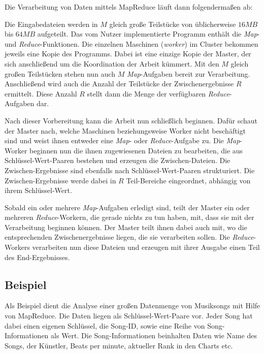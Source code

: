 Die Verarbeitung von Daten mittels MapReduce läuft dann folgendermaßen ab:

Die Eingabedateien werden in $M$ gleich große Teilstücke von üblicherweise $16 MB$ bis $64 MB$
aufgeteilt. Das vom Nutzer implementierte Programm enthält die \textit{Map}- und 
\textit{Reduce}-Funktionen. Die einzelnen Maschinen (\textit{worker}) im Cluster bekommen jeweils
eine Kopie des Programms. Dabei ist eine einzige Kopie der Master, der sich anschließend
um die Koordination der Arbeit kümmert. Mit den $M$ gleich großen Teilstücken stehen nun
auch $M $ \textit{Map}-Aufgaben bereit zur Verarbeitung. Anschließend wird auch die Anzahl der Teilstücke
der Zwischenergebnisse $R$ ermittelt. Diese Anzahl $R$ stellt dann die Menge der verfügbaren
\textit{Reduce}-Aufgaben dar.

Nach dieser Vorbereitung kann die Arbeit nun schließlich beginnen. Dafür schaut der Master nach,
welche Maschinen beziehungsweise Worker nicht beschäftigt sind und weist ihnen entweder eine \textit{Map}- oder \textit{Reduce}-Aufgabe zu. Die \textit{Map}-Worker beginnen nun
die ihnen zugewiesenen Dateien zu bearbeiten, die aus Schlüssel-Wert-Paaren bestehen und
erzeugen die Zwischen-Dateien. Die Zwischen-Ergebnisse sind ebenfalls nach Schlüssel-Wert-Paaren
strukturiert. Die Zwischen-Ergebnisse werde dabei in $R$ Teil-Bereiche eingeordnet, abhängig
von ihrem Schlüssel-Wert.

Sobald ein oder mehrere \textit{Map}-Aufgaben erledigt sind, teilt der Master ein oder mehreren 
\textit{Reduce}-Workern, die gerade nichts zu tun haben, mit, dass sie mit der Verarbeitung beginnen können. Der Master teilt ihnen dabei auch mit, wo die entsprechenden Zwischenergebnisse liegen,
die sie verarbeiten sollen. Die \textit{Reduce}-Workers verarbeiten nun diese Dateien und erzeugen
mit ihrer Ausgabe einen Teil des End-Ergebnisses.


\subsection{Beispiel}
Als Beispiel dient die Analyse einer großen Datenmenge von Musiksongs mit Hilfe von MapReduce. Die Daten liegen als
Schlüssel-Wert-Paare vor. Jeder Song hat dabei einen eigenen Schlüssel, die Song-ID, sowie eine Reihe von Song-Informationen als Wert.
Die Song-Informationen beinhalten Daten wie Name des Songs, der Künstler, Beats per minute, aktueller Rank in den Charts etc.

